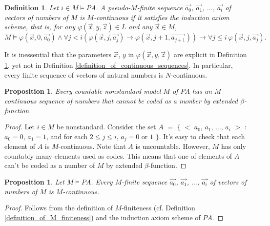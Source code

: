 \documentclass[a4paper,11pt]{article}
\begin{document}
\newtheorem{definition_of_M_continuous_sequences}[definition_of_continuous_sequences]{Definition}
\begin{definition_of_M_continuous_sequences}\label{definition_of_M_continuous_sequences}
  Let $i\in M\models PA$. A pseudo-$M$-finite sequence $\vec{a_0}$, $\vec{a_1}$, $\ldots$, $\vec{a_i}$ of vectors of numbers of $M$ is $M$-continuous if it satisfies the induction axiom scheme, that is, for any $\varphi(\vec{x},y,\vec{z})\in L$ and any $\vec{x}\in M$,
  \begin{equation*}
    M \models \varphi(\vec{x},0,\vec{a_0}) \wedge \forall j < i ( \varphi(\vec{x},j,\vec{a_j}) \rightarrow \varphi(\vec{x},j+1,\vec{a_{j+1}}) ) \rightarrow \forall j \leq i\ \varphi(\vec{x},j,\vec{a_j}).
  \end{equation*}
\end{definition_of_M_continuous_sequences}

It is inessential that the parameters $\vec{x}$, $y$ in $\varphi(\vec{x},y,\vec{z})$ are explicit in Definition \ref{definition_of_M_continuous_sequences}, yet not in Definition \ref{definition_of_continuous_sequences}. In particular, every finite sequence of vectors of natural numbers is $N$-continuous.

\theoremstyle{plain}
\newtheorem{M_continuous_is_uncodified}[definition_of_continuous_sequences]{Proposition}
\begin{M_continuous_is_uncodified}\label{M_continuous_is_uncodified}
  Every countable nonstandard model $M$ of $PA$ has an $M$-continuous sequence of numbers that cannot be coded as a number by extended $\beta$-function.
\end{M_continuous_is_uncodified}
\begin{proof}
  Let $i\in M$ be nonstandard. Consider the set $A$ $=$ $\{$ $<$ $a_0$, $a_1$, $\ldots$, $a_i$ $>$ : $a_0 = 0$, $a_1 = 1$, and for each $2 \leq j\leq i$, $a_j = 0$ or $1$ $\}$. It's easy to check that each element of $A$ is $M$-continuous. Note that $A$ is uncountable. However, $M$ has only countably many elements used as codes. This means that one of elements of $A$ can't be coded as a number of $M$ by extended $\beta$-function.
\end{proof}

\newtheorem{M_finiteness_is_M_continuous}[definition_of_continuous_sequences]{Proposition}
\begin{M_finiteness_is_M_continuous}\label{M_finiteness_is_M_continuous}
  Let $M\models PA$. Every $M$-finite sequence $\vec{a_0}$, $\vec{a_1}$, $\ldots$, $\vec{a_i}$ of vectors of numbers of $M$ is $M$-continuous.
\end{M_finiteness_is_M_continuous}
\begin{proof}
  Follows from the definition of $M$-finiteness (cf. Definition \ref{definition_of_M_finiteness}) and the induction axiom scheme of $PA$.
\end{proof}
\end{document}
